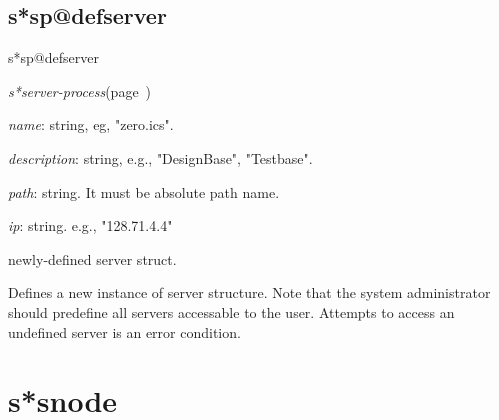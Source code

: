 \subsection{s*sp@defserver}
\label{s*sp@defserver}

\begin{description}
\item [Name:]  s*sp@defserver

\item [Class:]
{\sl s*server-process}\hfill(page~\pageref{s*server-process})

\item [Parameters:]
\item {\sl name}:  string, eg, "zero.ics".


\item {\sl description}:  string, e.g., "DesignBase", "Testbase". 


\item {\sl path}:  string. It must be absolute path name. 


\item {\sl ip}:  string. e.g., "128.71.4.4"



\item [Return-value:]
newly-defined server struct.

\item [Description:]
Defines a new instance of server structure.  Note that
the system administrator should predefine all servers
accessable to the user. Attempts to access an undefined
server is an error condition.

\item [Public:]



\end{description}
\horizontalline

\section{s*snode}
\label{s*snode}

